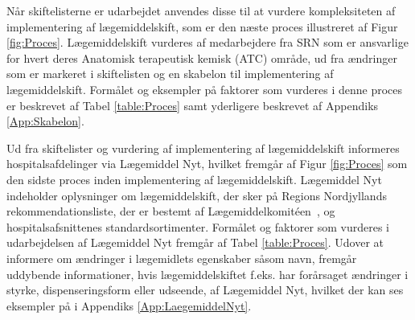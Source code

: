 Når skiftelisterne er udarbejdet anvendes disse til at vurdere kompleksiteten af implementering af lægemiddelskift, som er den næste proces illustreret af Figur \ref{fig:Proces}. Lægemiddelskift vurderes af medarbejdere fra SRN som er ansvarlige for hvert deres Anatomisk terapeutisk kemisk (ATC) område, ud fra ændringer som er markeret i skiftelisten og en skabelon til implementering af lægemiddelskift. Formålet og eksempler på faktorer som vurderes i denne proces er beskrevet af Tabel \ref{table:Proces} samt yderligere beskrevet af Appendiks \ref{App:Skabelon}.

Ud fra skiftelister og vurdering af implementering af lægemiddelskift informeres hospitalsafdelinger via Lægemiddel Nyt, hvilket fremgår af Figur \ref{fig:Proces} som den sidste proces inden implementering af lægemiddelskift. Lægemiddel Nyt indeholder oplysninger om lægemiddelskift, der sker på Regions Nordjyllands rekommendationsliste, der er bestemt af Lægemiddelkomitéen~\citep{RegionNordjylland2018}, og hospitalsafsnittenes standardsortimenter. Formålet og faktorer som vurderes i udarbejdelsen af Lægemiddel Nyt fremgår af Tabel \ref{table:Proces}. Udover at informere om ændringer i lægemidlets egenskaber såsom navn, fremgår uddybende informationer, hvis lægemiddelskiftet f.eks. har forårsaget ændringer i styrke, dispenseringsform eller udseende, af Lægemiddel Nyt, hvilket der kan ses eksempler på i Appendiks \ref{App:LaegemiddelNyt}.














